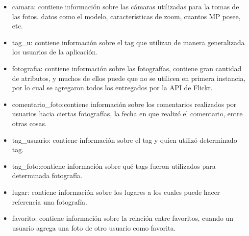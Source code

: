 \documentclass{memoria}
\begin{document}
\begin{itemize}
	\item camara: contiene información sobre las cámaras utilizadas para la tomas de las fotos. datos como el modelo, características de zoom, cuantos MP posee, etc.
	\item tag\_u: contiene información sobre el tag que utilizan de manera generalizada los usuarios de la aplicación.
	\item fotografia: contiene información sobre las fotografías, contiene gran cantidad de atributos, y muchos de ellos puede que no se utilicen en primera instancia, por lo cual se agregaron todos los entregados por la API de Flickr.
	\item comentario\_foto:contiene información sobre los comentarios realizados por usuarios hacia ciertas fotografías, la fecha en que realizó el comentario, entre otras cosas. 
	\item tag\_usuario: contiene información sobre el tag y quien utilizó determinado tag.
	\item tag\_foto:contiene información sobre qué tags fueron utilizados para determinada fotografía.
	\item lugar: contiene información sobre los lugares a los cuales puede hacer referencia una fotografía.
	\item favorito: contiene información sobre la relación entre favoritos, cuando un usuario agrega una foto de otro usuario como favorita.
\end{itemize}

\newpage


\end{document}
